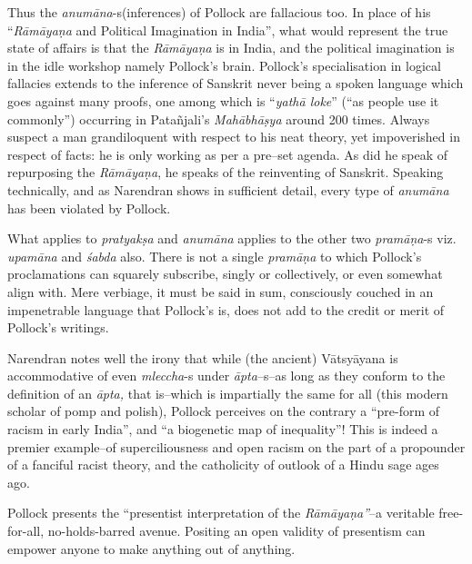 Thus the \textit{anumāna}-s(inferences) of Pollock are fallacious too. In place of his “\textit{Rāmāyaṇa} and Political Imagination in India”, what would represent the true state of affairs is that the \textit{Rāmāyaṇa} is in India, and the political imagination is in the idle workshop namely Pollock’s brain. Pollock’s specialisation in logical fallacies extends to the inference of Sanskrit never being a spoken language which goes against many proofs, one among which is “\textit{yathā loke}” (“as people use it commonly”) occurring in Patañjali’s \textit{Mahābhāṣya} around 200 times. Always suspect a man grandiloquent with respect to his neat theory, yet impoverished in respect of facts: he is only working as per a pre–set agenda. As did he speak of repurposing the \textit{Rāmāyaṇa}, he speaks of the reinventing of Sanskrit. Speaking technically, and as Narendran shows in sufficient detail, every type of \textit{anumāna} has been violated by Pollock.

What applies to \textit{pratyakṣa} and \textit{anumāna} applies to the other two \textit{pramāṇa}-s viz. \textit{upamāna} and \textit{śabda} also. There is not a single \textit{pramāṇa} to which Pollock’s proclamations can squarely subscribe, singly or collectively, or even somewhat align with. Mere verbiage, it must be said in sum, consciously couched in an impenetrable language that Pollock’s is, does not add to the credit or merit of Pollock’s writings.

Narendran notes well the irony that while (the ancient) Vātsyāyana is accommodative of even \textit{mleccha}-s under \textit{āpta}–s–as long as they conform to the definition of an \textit{āpta,} that is–which is impartially the same for all (this modern scholar of pomp and polish), Pollock perceives on the contrary a “pre-form of racism in early India”, and “a biogenetic map of inequality”! This is indeed a premier example–of superciliousness and open racism on the part of a propounder of a fanciful racist theory, and the catholicity of outlook of a Hindu sage ages ago.

Pollock presents the “presentist interpretation of the \textit{Rāmāyaṇa”}–a veritable free-for-all, no-holds-barred avenue. Positing an open validity of presentism can empower anyone to make anything out of anything.

